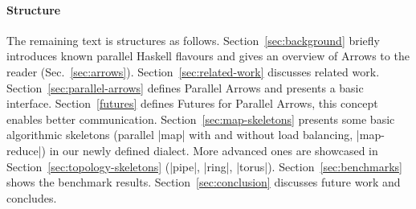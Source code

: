 \paragraph{Structure}
The remaining text is structures as follows. Section~\ref{sec:background} briefly introduces known parallel Haskell flavours and gives an overview of Arrows to the reader (Sec.~\ref{sec:arrows}). Section~\ref{sec:related-work} discusses related work. Section~\ref{sec:parallel-arrows} defines Parallel Arrows and presents a basic interface. Section~\ref{futures} defines Futures for Parallel Arrows, this concept enables better communication. Section~\ref{sec:map-skeletons} presents some basic algorithmic skeletons (parallel |map| with and without load balancing, |map-reduce|) in our newly defined dialect. More advanced ones are showcased in Section~\ref{sec:topology-skeletons} (|pipe|, |ring|, |torus|). Section~\ref{sec:benchmarks} shows the benchmark results. Section~\ref{sec:conclusion} discusses future work and concludes.

